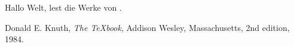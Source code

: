\documentclass[12pt,ngerman]{scrartcl}
\begin{document}
Hallo Welt, lest die Werke von \cite{knuth}.

\begin{thebibliography}{9}

  Donald E. Knuth,
  \textit{The \TeX book},
  Addison Wesley, Massachusetts,
  2nd edition,
  1984.

\end{thebibliography}
\end{document}
